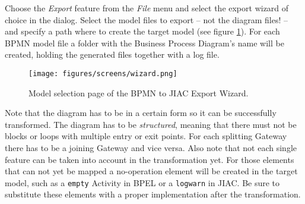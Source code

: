 Choose the \emph{Export} feature from the \emph{File} menu and select the export wizard of choice in the dialog. Select the model files to export -- not the diagram files! -- and specify a path where to create the target model (see figure \ref{fig:wizard}). For each BPMN model file a folder with the Business Process Diagram's name will be created, holding the generated files together with a log file.

\begin{figure}[ht]
\centering
\texttt{[image: figures/screens/wizard.png]}
\caption[BPMN Export Wizard]{Model selection page of the BPMN to JIAC Export Wizard.}
\label{fig:wizard}
\end{figure}

Note that the diagram has to be in a certain form so it can be successfully transformed. The diagram has to be \emph{structured}, meaning that there must not be blocks or loops with multiple entry or exit points. For each splitting Gateway there has to be a joining Gateway and vice versa. Also note that not each single feature can be taken into account in the transformation yet. For those elements that can not yet be mapped a no-operation element will be created in the target model, such as a \verb|empty| Activity in BPEL or a \verb|logwarn| in JIAC. Be sure to substitute these elements with a proper implementation after the transformation.
